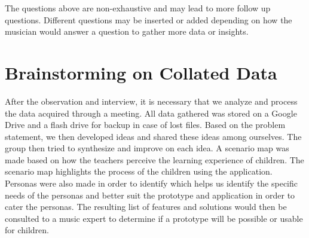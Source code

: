 The questions above are non-exhaustive and may lead to more follow up questions. Different questions may be inserted or added depending on how the musician would answer a question to gather more data or insights.

\section{Brainstorming on Collated Data}
After the observation and interview, it is necessary that we analyze and process the data acquired through a meeting. All data gathered was stored on a Google Drive and a flash drive for backup in case of lost files. Based on the problem statement, we then developed ideas and shared these ideas among ourselves. The group then tried to synthesize and improve on each idea. A scenario map was made based on how the teachers perceive the learning experience of children. The scenario map highlights the process of the children using the application. Personas were also made in order to identify which helps us identify the specific needs of the personas and better suit the prototype and application in order to cater the personas. The resulting list of features and solutions would then be consulted to a music expert to determine if a prototype will be possible or usable for children.


